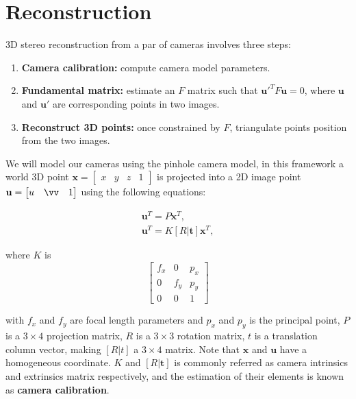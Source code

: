 \documentclass[12pt]{article}
\begin{document}
\FloatBarrier
\section{Reconstruction}

3D stereo reconstruction from a par of cameras involves three steps:
\begin{enumerate}
\item \textbf{Camera calibration:} compute camera model parameters.
\item \textbf{Fundamental matrix:} estimate an $F$ matrix such that $\mathbf{u}'^TF\mathbf{u} = 0$, where $\mathbf{u}$ and $\mathbf{u}'$ are corresponding points in two images.
\item \textbf{Reconstruct 3D points:} once constrained by $F$, triangulate points position from the two images.
\end{enumerate}

We will model our cameras using the pinhole camera model, in this framework a world 3D point $\mathbf{x} = \begin{bmatrix} x & y & z & 1 \end{bmatrix}$ is projected into a 2D image point $\mathbf{u} = \begin{bmatrix} u & \vv & 1 \end{bmatrix}$ using the following equations:

\begin{gather}
	\mathbf{u}^T = P \mathbf{x}^T, \label{eq:matrixP} \\
	\mathbf{u}^T = K [R | \mathbf{t}] \mathbf{x}^T, \label{eq:matrixRT}
\end{gather}

where $K$ is 
\begin{equation}
\begin{bmatrix}
f_x & 0 & p_x \\ 
0 & f_y & p_y \\ 
0 & 0 & 1
\end{bmatrix}
\end{equation}

with $f_x$ and $f_y$ are focal length parameters and $p_x$ and $p_y$ is the principal point, $P$ is a $3 \times 4$ projection matrix, $R$ is a $3 \times 3$ rotation matrix, $t$ is a translation column vector, making $[R|t]$ a $3 \times 4$ matrix.
Note that $\mathbf{x}$ and $\mathbf{u}$ have a homogeneous coordinate.
$K$ and $[R|\mathbf{t}]$ is commonly referred as camera intrinsics and extrinsics matrix respectively, and the estimation of their elements is known as \textbf{camera calibration}.
\end{document}

